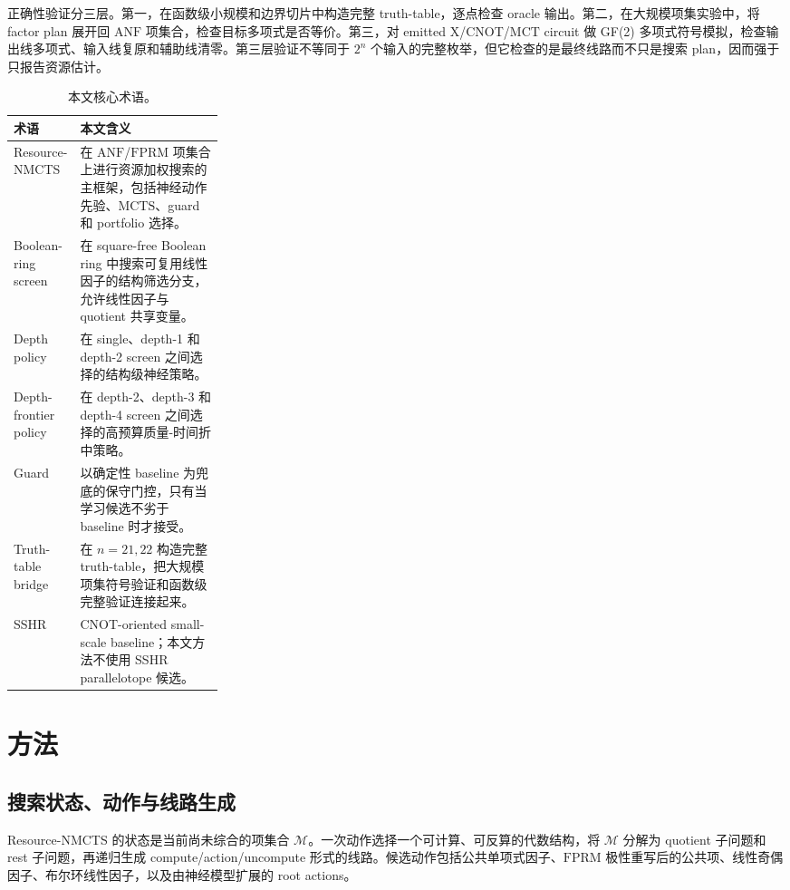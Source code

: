 \documentclass[UTF8,fontset=macnew,11pt]{ctexart}
\newcommand{\method}{Resource-NMCTS}
\newcommand{\screen}{Boolean-ring screen}
\newcommand{\anf}{\ensuremath{\mathrm{ANF}}}
\newcommand{\fprm}{\ensuremath{\mathrm{FPRM}}}
\newcommand{\mcts}{\ensuremath{\mathrm{MCTS}}}
\newcommand{\ttable}{truth-table}
\newcommand{\mct}{\ensuremath{\mathrm{MCT}}}
\begin{document}
正确性验证分三层。第一，在函数级小规模和边界切片中构造完整 \ttable{}，逐点检查 oracle 输出。第二，在大规模项集实验中，将 factor plan 展开回 \anf{} 项集合，检查目标多项式是否等价。第三，对 emitted X/CNOT/\mct{} circuit 做 GF(2) 多项式符号模拟，检查输出线多项式、输入线复原和辅助线清零。第三层验证不等同于 $2^n$ 个输入的完整枚举，但它检查的是最终线路而不只是搜索 plan，因而强于只报告资源估计。

\begin{table}[H]
\centering
\small
\caption{本文核心术语。}
\label{tab:terms}
\begin{tabularx}{\linewidth}{>{\raggedright\arraybackslash}p{0.27\linewidth}>{\raggedright\arraybackslash}X}
\toprule
术语 & 本文含义 \\
\midrule
\method{} & 在 \anf{}/\fprm{} 项集合上进行资源加权搜索的主框架，包括神经动作先验、\mcts{}、guard 和 portfolio 选择。 \\
\screen{} & 在 square-free Boolean ring 中搜索可复用线性因子的结构筛选分支，允许线性因子与 quotient 共享变量。 \\
Depth policy & 在 single、depth-1 和 depth-2 screen 之间选择的结构级神经策略。 \\
Depth-frontier policy & 在 depth-2、depth-3 和 depth-4 screen 之间选择的高预算质量-时间折中策略。 \\
Guard & 以确定性 baseline 为兜底的保守门控，只有当学习候选不劣于 baseline 时才接受。 \\
Truth-table bridge & 在 $n=21,22$ 构造完整 \ttable{}，把大规模项集符号验证和函数级完整验证连接起来。 \\
SSHR & CNOT-oriented small-scale baseline；本文方法不使用 SSHR parallelotope 候选。 \\
\bottomrule
\end{tabularx}
\end{table}

\section{方法}

\subsection{搜索状态、动作与线路生成}

\method{} 的状态是当前尚未综合的项集合 $\mathcal{M}$。一次动作选择一个可计算、可反算的代数结构，将 $\mathcal{M}$ 分解为 quotient 子问题和 rest 子问题，再递归生成 compute/action/uncompute 形式的线路。候选动作包括公共单项式因子、\fprm{} 极性重写后的公共项、线性奇偶因子、布尔环线性因子，以及由神经模型扩展的 root actions。
\end{document}
